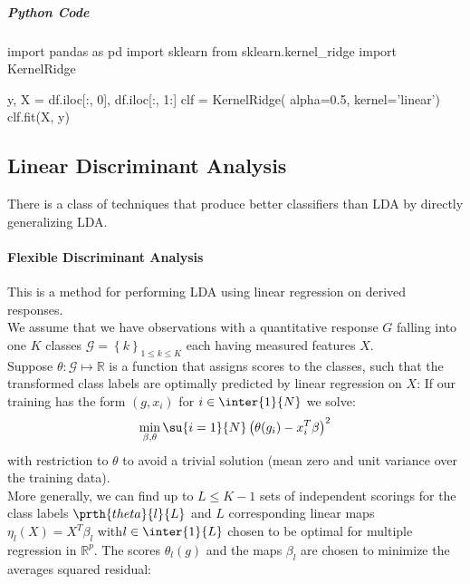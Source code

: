 \subparagraph{Python Code}
\begin{python}
import pandas as pd
import sklearn
from sklearn.kernel_ridge import KernelRidge

y, X = df.iloc[:, 0], df.iloc[:, 1:]
clf = KernelRidge(
    alpha=0.5,
    kernel='linear')
clf.fit(X, y)
\end{python}

\subsection{Linear Discriminant Analysis}
There is a class of techniques that produce better classifiers than LDA by directly generalizing
LDA.

\paragraph{Flexible Discriminant Analysis}
This is a method for performing LDA using linear regression on derived responses.\\
We assume that we have observations with a quantitative response $G$ falling into one $K$ classes
$\mathcal{G}=\left\{k\right\}_{1\leq k\leq K}$ each having measured features $X$.\\
Suppose $\theta:\mathcal{G}\mapsto\mathbb{R}$ is a function that assigns scores to the classes,
such that the transformed class labels are optimally predicted by linear regression on $X$: If
our training has the form $\left(g,x_{i}\right)$ for $i\in\inter{1}{N}$ we solve:
$$ \min\limits_{\beta,\theta}\su{{i=1}}{N}\left(\theta(g_{i})-x_{i}^{T}\beta\right)^{2}$$
with restriction to $\theta$ to avoid a trivial solution (mean zero and unit variance over the 
training data).\\
More generally, we can find up to $L\leq K-1$ sets of independent scorings for the class labels
$\prth{theta}{l}{L}$ and $L$ corresponding linear maps $\eta_{l}(X)=X^{T}\beta_{l}$ with$l\in
\inter{1}{L}$ chosen to be optimal for multiple regression in $\mathbb{R}^{p}$. The scores
$\theta_{l}(g)$ and the maps $\beta_{l}$ are chosen to minimize the averages squared residual:

